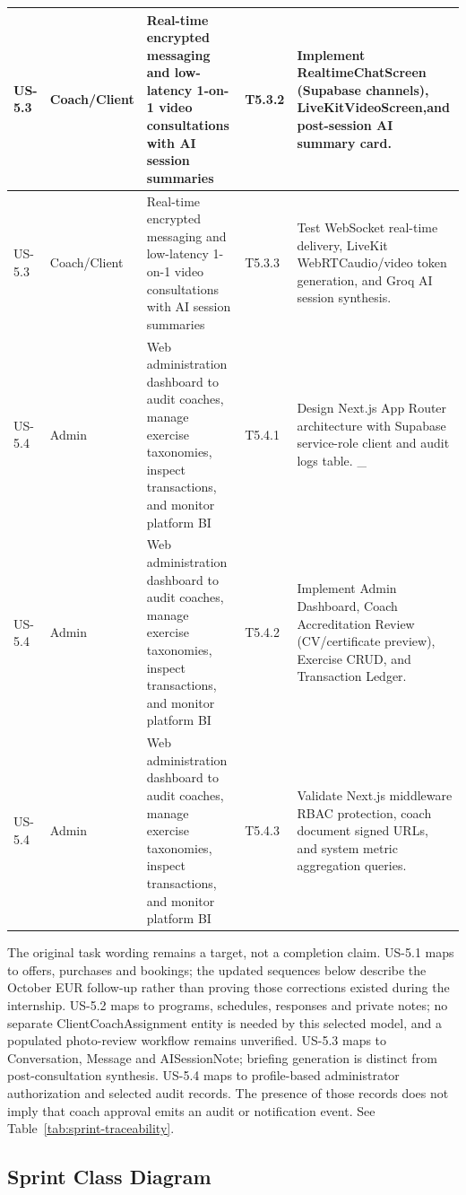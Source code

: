 \documentclass[12pt,a4paper,openany]{report}
\begin{document}
\begin{longtable}{|L{1.20cm}|L{2.00cm}|L{5.40cm}|L{1.80cm}|L{4.00cm}|}
US-5.3 & Coach/Client & Real-time encrypted messaging and low-latency 1-on-1 video consultations with AI session summaries & T5.3.2 & Implement RealtimeChatScreen (Supabase channels), LiveKitVideoScreen,and post-session AI summary card. \\ \hline
US-5.3 & Coach/Client & Real-time encrypted messaging and low-latency 1-on-1 video consultations with AI session summaries & T5.3.3 & Test WebSocket real-time delivery, LiveKit WebRTCaudio/video token generation, and Groq AI session synthesis. \\ \hline
US-5.4 & Admin & Web administration dashboard to audit coaches, manage exercise taxonomies, inspect transactions, and monitor platform BI & T5.4.1 & Design Next.js App Router architecture with Supabase service-role client and audit logs table. \_ \\ \hline
US-5.4 & Admin & Web administration dashboard to audit coaches, manage exercise taxonomies, inspect transactions, and monitor platform BI & T5.4.2 & Implement Admin Dashboard, Coach Accreditation Review (CV/certificate preview), Exercise CRUD, and Transaction Ledger. \\ \hline
US-5.4 & Admin & Web administration dashboard to audit coaches, manage exercise taxonomies, inspect transactions, and monitor platform BI & T5.4.3 & Validate Next.js middleware RBAC protection, coach document signed URLs, and system metric aggregation queries. \\ \hline
\end{longtable}
\endgroup

The original task wording remains a target, not a completion claim. US-5.1 maps to offers, purchases and bookings; the updated sequences below describe the October EUR follow-up rather than proving those corrections existed during the internship. US-5.2 maps to programs, schedules, responses and private notes; no separate ClientCoachAssignment entity is needed by this selected model, and a populated photo-review workflow remains unverified. US-5.3 maps to Conversation, Message and AISessionNote; briefing generation is distinct from post-consultation synthesis. US-5.4 maps to profile-based administrator authorization and selected audit records. The presence of those records does not imply that coach approval emits an audit or notification event. See Table~\ref{tab:sprint-traceability}.

\subsection{Sprint Class Diagram}
\end{document}
